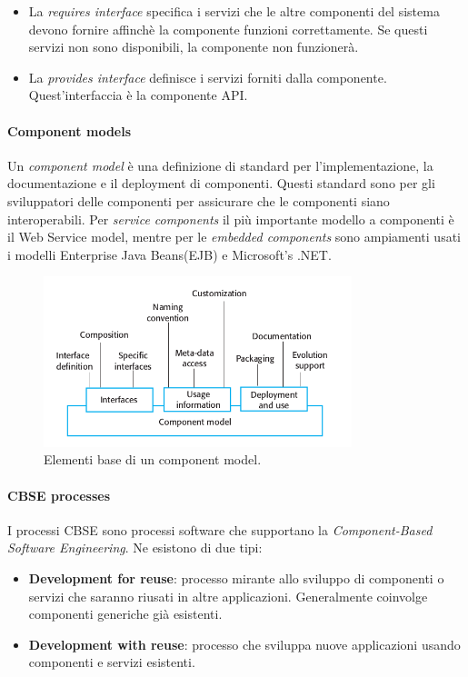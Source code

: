  			\begin{itemize}
 			 	\item La \textit{requires interface} specifica i servizi che le altre componenti del sistema devono fornire affinchè la componente funzioni correttamente. Se questi servizi non sono disponibili, la componente non funzionerà.
 			 	\item La \textit{provides interface} definisce i servizi forniti dalla componente. Quest'interfaccia è la componente API.
 			\end{itemize} 
 		
 			\paragraph{Component models}
 			Un \textit{component model} è una definizione di standard per l'implementazione, la documentazione e il deployment di componenti. Questi standard sono per gli sviluppatori delle componenti per assicurare che le componenti siano interoperabili. Per \textit{service components} il più importante modello a componenti è il Web Service model, mentre per le \textit{embedded components} sono ampiamenti usati i modelli Enterprise Java Beans(EJB) e Microsoft's .NET.
 			
 			\begin{figure}[H]
 				\centering
 				\includegraphics[width=0.8\textwidth]{img/componentmodel}		
 				\caption{Elementi base di un component model.}
 			\end{figure} 
 		
 			\paragraph{CBSE processes}
 			I processi CBSE sono processi software che supportano la \textit{Component-Based Software Engineering}. Ne esistono di due tipi:
 			\begin{itemize}
 				\item \textbf{Development for reuse}: processo mirante allo sviluppo di componenti o servizi che saranno riusati in altre applicazioni. Generalmente coinvolge componenti generiche già esistenti.
 				\item \textbf{Development with reuse}: processo che sviluppa nuove applicazioni usando componenti e servizi esistenti.
 			\end{itemize}
 		
